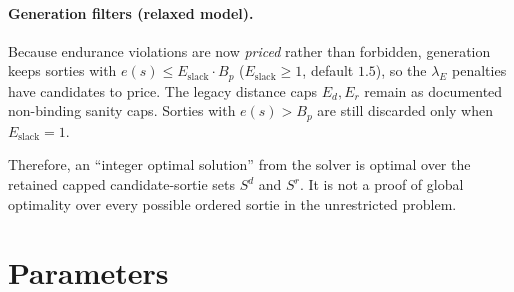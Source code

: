 \documentclass[10pt]{article}
\begin{document}
\paragraph{Generation filters (relaxed model).} Because endurance violations are
now \emph{priced} rather than forbidden, generation keeps sorties with
$e(s) \le E_{\mathrm{slack}}\cdot B_p$ ($E_{\mathrm{slack}}\ge 1$, default $1.5$),
so the $\lambda_E$ penalties have candidates to price. The legacy distance caps
$E_d, E_r$ remain as documented non-binding sanity caps. Sorties with
$e(s) > B_p$ are still discarded only when $E_{\mathrm{slack}} = 1$.

Therefore, an ``integer optimal solution'' from the solver is optimal over the
retained capped candidate-sortie sets $S^d$ and $S^r$. It is not a proof of
global optimality over every possible ordered sortie in the unrestricted problem.

\section{Parameters}
\label{sec:parameters}
\end{document}
